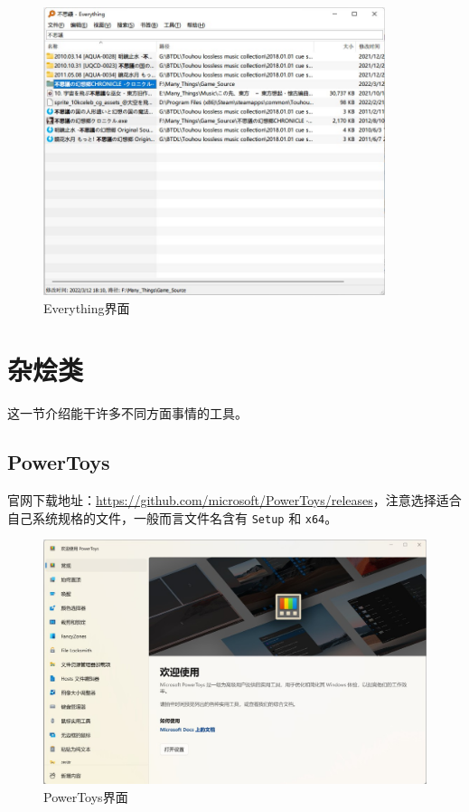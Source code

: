 \begin{figure}[htb!]
  \centering
  \includegraphics[width=10cm]{assets/Everything.jpg}
  \caption{Everything界面}
  \label{Everything}
\end{figure}

\section{杂烩类}

这一节介绍能干许多不同方面事情的工具。

\subsection{PowerToys}

官网下载地址：\url{https://github.com/microsoft/PowerToys/releases}，注意选择适合自己系统规格的文件，一般而言文件名含有 \verb|Setup| 和 \verb|x64|。

\begin{figure}[htb!]
  \centering
  \includegraphics[width=.9\textwidth]{assets/PowerToys.jpg}
  \caption{PowerToys界面}
  \label{PowerToys}
\end{figure}


